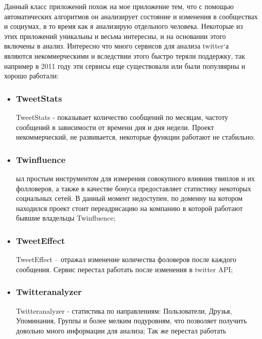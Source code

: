 \begin{chap1}
Данный класс приложений похож на мое приложение тем, что с помощью автоматических алгоритмов  он анализирует состояние и изменения в сообществах и социумах, в то время как я анализирую отдельного человека. Некоторые из этих приложений уникальны и весьма интересны, и на основании этого включены в анализ. Интересно что много сервисов для анализа twitter`а являются некоммерческими и вследствии этого быстро теряли поддержку, так например в 2011 году эти сервисы еще существовали или были популяярны и хорошо работали:
\begin{itemize}
\item \subsubsection{TweetStats}
TweetStats - показывает количество сообщений по месяцам, частоту сообщений в зависимости от времени дня и дня недели. Проект некоммерческий, не развивается, некоторые функции работают не стабильно;
\item \subsubsection{Twinfluence}
ыл простым инструментом для измерения совокупного влияния твиплов и их фолловеров, а также в качестве бонуса предоставляет статистику некоторых социальных сетей. В данный момент недоступен, по доменну на котором находился проект стоит переадрисацию на компанию в которой работают бывшие владельцы Twinfluence;
\item \subsubsection{TweetEffect}
TweetEffect – отражал изменение количества фоловеров после каждого сообщения. Сервис перестал работать после изменения в twitter API;
\item \subsubsection{Twitteranalyzer}
Twitteranalyzer - статистика по  направлениям: Пользователи, Друзья, Упоминания, Группы и более мелким подуровням, что позволяет получить довольно много информации для анализа; Так же перестал работать

\end{itemize}
\end{chap1}
